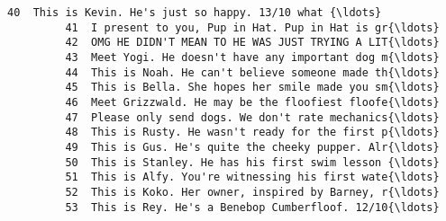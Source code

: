 \documentclass[11pt]{article}
\begin{document}
\begin{Verbatim}[commandchars=\\\{\}]
         40  This is Kevin. He's just so happy. 13/10 what {\ldots}   
         41  I present to you, Pup in Hat. Pup in Hat is gr{\ldots}   
         42  OMG HE DIDN'T MEAN TO HE WAS JUST TRYING A LIT{\ldots}   
         43  Meet Yogi. He doesn't have any important dog m{\ldots}   
         44  This is Noah. He can't believe someone made th{\ldots}   
         45  This is Bella. She hopes her smile made you sm{\ldots}   
         46  Meet Grizzwald. He may be the floofiest floofe{\ldots}   
         47  Please only send dogs. We don't rate mechanics{\ldots}   
         48  This is Rusty. He wasn't ready for the first p{\ldots}   
         49  This is Gus. He's quite the cheeky pupper. Alr{\ldots}   
         50  This is Stanley. He has his first swim lesson {\ldots}   
         51  This is Alfy. You're witnessing his first wate{\ldots}   
         52  This is Koko. Her owner, inspired by Barney, r{\ldots}   
         53  This is Rey. He's a Benebop Cumberfloof. 12/10{\ldots}   
         

\end{Verbatim}
\end{document}
